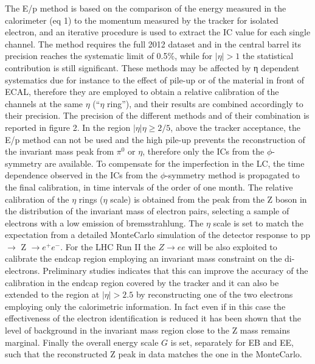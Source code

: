 \documentclass[journal]{IEEEtran}
\begin{document}
The E/p method is based on the comparison of the energy measured in the calorimeter (eq 1) to the momentum measured by the tracker for isolated electron, and an iterative procedure is used to extract the IC value for each single channel. The method requires the full 2012 dataset and in the central barrel its precision reaches the systematic limit of 0.5\%, while for $\vert\eta\vert>1$ the statistical contribution is still significant.
These methods may be affected by η dependent systematics due for instance to the effect of pile-up or of the material in front of ECAL, therefore they are employed to obtain a relative calibration of the channels at the same $\eta$ (``$\eta$ ring''), and their results are combined accordingly to their precision. The precision of the different methods and of their combination is reported in figure 2. In the region $\vert\eta\vert\eta\ge2/5$, above the tracker acceptance, the E/p method can not be used and the high pile-up prevents the reconstruction of the invariant mass peak from $\pi^0$ or $\eta$, therefore only the ICs from the $\phi$-symmetry are available.
To compensate for the imperfection in the LC, the time dependence observed in the ICs from the $\phi$-symmetry method is propagated to the final calibration, in time intervals of the order of one month.
The relative calibration of the $\eta$ rings ($\eta$ scale) is obtained from the peak from the Z boson in the distribution of the invariant mass of electron pairs, selecting a sample of electrons with a low emission of bremsstrahlung. The $\eta$ scale is set to match the expectation from a detailed MonteCarlo simulation of the detector response to pp $\to$ Z $\to e^+e^-$. For the LHC Run II the $Z\to ee$ will be also exploited to calibrate the endcap region employing an invariant mass constraint on the di-electrons. Preliminary studies indicates that this can improve the accuracy of the calibration in the endcap region covered by the tracker and it can also be extended to the region at $\vert\eta\vert>2.5$ by reconstructing one of the two electrons employing only the calorimetric information. In fact even if in this case the effectiveness of the electron identification is reduced it has been shown that the level of background in the invariant mass region close to the Z mass remains marginal.
Finally the overall energy scale $G$ is set, separately for EB and EE, such that the reconstructed Z peak in data matches the one in the MonteCarlo.
\end{document}
